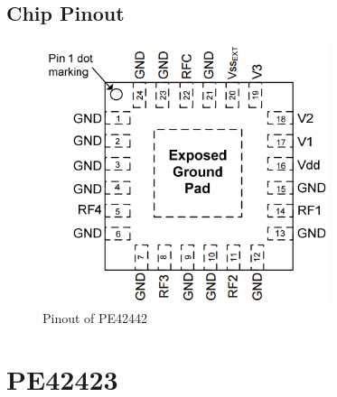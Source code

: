 \documentclass[12pt,openany,a4paper]{book}
\begin{document}
\subsection{Chip Pinout}
\begin{figure}[H]
	\centering
    \includegraphics[width=0.75\textwidth]{pe424244-datasheet-pinout.png}
	\caption{Pinout of PE42442}
	\label{fig:pe42442-pinout}
\end{figure} 



\section{PE42423}
\end{document}
